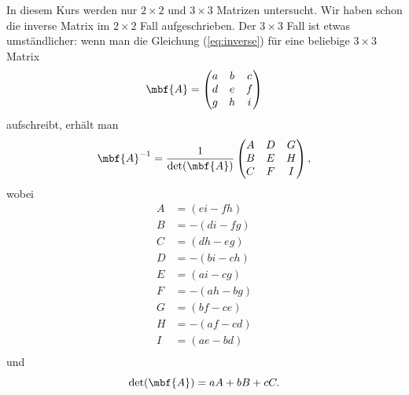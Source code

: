 In diesem Kurs werden nur $2\times 2$ und $3\times 3$ Matrizen untersucht. Wir haben schon die inverse Matrix im $2\times 2$ Fall aufgeschrieben. Der $3\times 3$ Fall ist etwas umständlicher: wenn man die Gleichung (\ref{eq:inverse}) für eine beliebige $3\times 3$ Matrix 
\begin{equation}
	\mbf{A} = \begin{pmatrix}
		a&b&c \\
		d&e&f \\
		g&h&i \\
	\end{pmatrix}
\end{equation}
aufschreibt, erhält man
\begin{equation}
	\mbf{A}^{-1} = \frac{1}{\det(\mbf{A})}\begin{pmatrix}
		A & D & G \\
		B & E & H \\
		C & F & I \\		
	\end{pmatrix},
\end{equation}
wobei
\begin{equation}
	\begin{split}
		A &= (ei-fh)\\
		B &= -(di-fg)\\
		C &= (dh-eg)\\
		D &= -(bi-ch)\\
		E &= (ai-cg)\\
		F &= -(ah-bg)\\
		G &= (bf-ce)\\
		H &= -(af-cd)\\
		I &= (ae-bd)\\
	\end{split}
\end{equation}
und
\begin{equation}
	\det(\mbf{A}) = aA+bB+cC.
\end{equation}